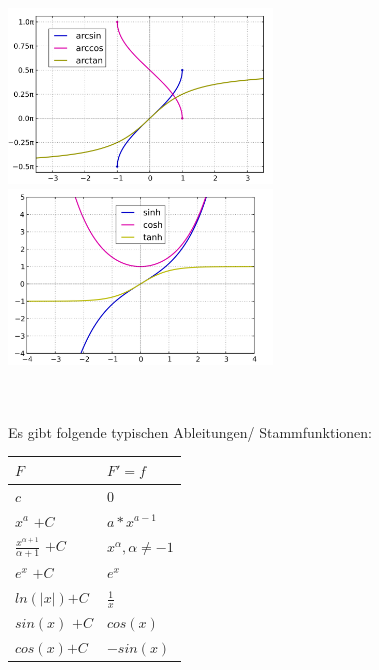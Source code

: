 \documentclass[10pt]{article}
\def\light#1{{\color{light}#1}}
\begin{document}
\begin{multicols*}{3}
  \includegraphics[width=7cm]{arcsinArccosArctan.png}
  \includegraphics[width=7cm]{sinhCoshTanh.png}\\ \\
  \\
  Es gibt folgende typischen Ableitungen/ Stammfunktionen:
  \begin{center}
    \begin{tabular}{ l l }
      $F$                                            & $F' = f$                              \\[2ex]\hline
      \rule{0pt}{4ex}
      $c$                                            & $0$                                   \\[2ex]
      $x^a$ \light{$+C$}                             & $a * x^{a - 1}$                       \\[2ex]
      $\frac{x^{\alpha+1}}{\alpha + 1}$ \light{$+C$} & $x^\alpha, \alpha \neq -1$            \\[2ex]
      $e^x$ \light{$+C$}                             & $e^x$                                 \\[2ex]
      $ln(|x|)$\light{$+C$}                          & $\frac{1}{x}$                         \\[2ex]
      $sin(x)$ \light{$+C$}                          & $cos(x)$                              \\[2ex]
      $cos(x)$\light{$+C$}                           & $-sin(x)$                             \\[2ex]

\end{tabular}
\end{center}
\end{multicols*}
\end{document}
